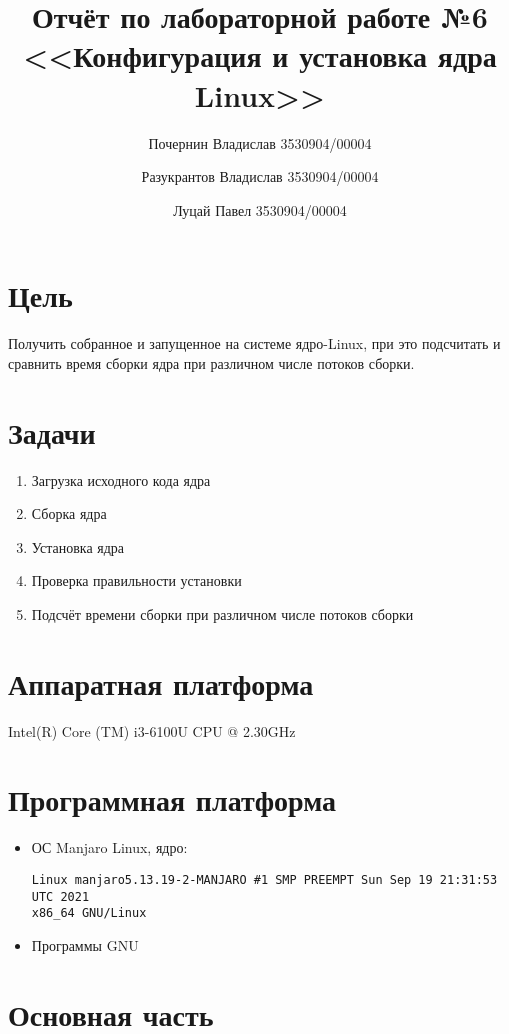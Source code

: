 \documentclass[a4paper]{article}
\title{Отчёт по лабораторной работе №6\\<<Конфигурация и установка ядра Linux>>}
\author{
    Почернин Владислав 3530904/00004
    \and
    Разукрантов Владислав 3530904/00004
    \and
    Луцай Павел 3530904/00004
}
\begin{document}
    \maketitle


    \section{Цель}
    Получить собранное и запущенное на системе ядро-Linux, при это
    подсчитать и сравнить время сборки ядра при различном числе потоков сборки.


    \section{Задачи}
    \begin{enumerate}
        \item Загрузка исходного кода ядра
        \item Сборка ядра
        \item Установка ядра
        \item Проверка правильности установки
        \item Подсчёт времени сборки при различном числе потоков сборки
    \end{enumerate}


    \section{Аппаратная платформа}
    Intel(R) Core (TM) i3-6100U CPU @ 2.30GHz


    \section{Программная платформа}
    \begin{itemize}
        \item ОС Manjaro Linux, ядро:
        \begin{verbatim}
Linux manjaro5.13.19-2-MANJARO #1 SMP PREEMPT Sun Sep 19 21:31:53 UTC 2021
x86_64 GNU/Linux
        \end{verbatim}
        \item Программы GNU
    \end{itemize}


    \section{Основная часть}
\end{document}
